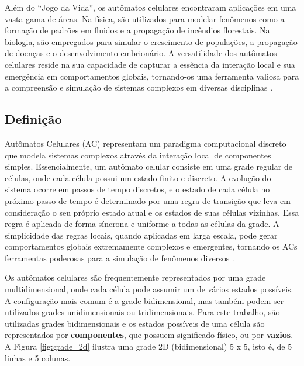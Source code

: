 \documentclass[12pt,oneside]{report}
\begin{document}
Além do ``Jogo da Vida'', os autômatos celulares encontraram aplicações em uma vasta gama de áreas. Na física, são utilizados para modelar fenômenos como a formação de padrões em fluidos e a propagação de incêndios florestais. Na biologia, são empregados para simular o crescimento de populações, a propagação de doenças e o desenvolvimento embrionário. A versatilidade dos autômatos celulares reside na sua capacidade de capturar a essência da interação local e sua emergência em comportamentos globais, tornando-os uma ferramenta valiosa para a compreensão e simulação de sistemas complexos em diversas disciplinas \cite{kier2005}.

\subsection{Definição}
\label{sec:definicao}

Autômatos Celulares (AC) representam um paradigma computacional discreto que modela sistemas complexos através da interação local de componentes simples. Essencialmente, um autômato celular consiste em uma grade regular de células, onde cada célula possui um estado finito e discreto. A evolução do sistema ocorre em passos de tempo discretos, e o estado de cada célula no próximo passo de tempo é determinado por uma regra de transição que leva em consideração o seu próprio estado atual e os estados de suas células vizinhas. Essa regra é aplicada de forma síncrona e uniforme a todas as células da grade. A simplicidade das regras locais, quando aplicadas em larga escala, pode gerar comportamentos globais extremamente complexos e emergentes, tornando os ACs ferramentas poderosas para a simulação de fenômenos diversos \cite{kier2005} \cite{wolfram2002}.

Os autômatos celulares são frequentemente representados por uma grade multidimensional, onde cada célula pode assumir um de vários estados possíveis. A configuração mais comum é a grade bidimensional, mas também podem ser utilizados grades unidimensionais ou tridimensionais. Para este trabalho, são utilizadas grades bidimensionais e os estados possíveis de uma célula são representados por \textbf{componentes}, que possuem significado físico, ou por \textbf{vazios}. A Figura \ref{fig:grade_2d} ilustra uma grade 2D (bidimensional) 5 x 5, isto é, de 5 linhas e 5 colunas.
\end{document}
